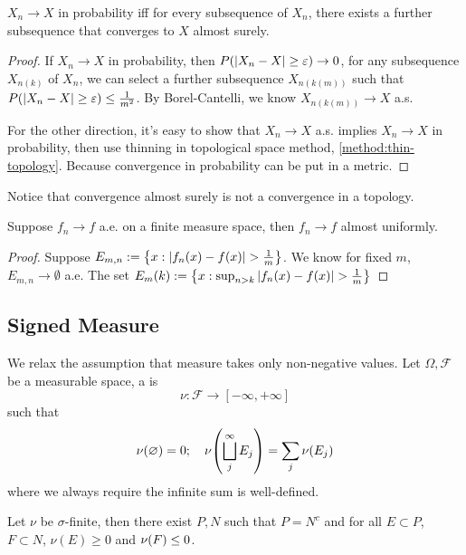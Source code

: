 \begin{thm}
    \(X_{n} \to X\) in probability iff for every subsequence of \(X_{n}\), there exists a further subsequence that converges to \(X\) almost surely. 
\end{thm}
\begin{proof}
    If \(X_{n}\to X\) in probability, then \(P\pqty{\abs{X_{n} - X} \geq \epsilon} \to 0\), for any subsequence \(X_{n(k)}\) of \(X_{n}\), we can select a further subsequence \(X_{n(k(m))}\) such that \(P \pqty{\abs{X_{n} - X} \geq \epsilon} \leq \frac{1}{m^{2}}\). By Borel-Cantelli, we know \(X_{n(k(m))} \to X\) a.s. 

    For the other direction, it's easy to show that \(X_{n} \to X\) a.s. implies \(X_{n}\to X\) in probability, then use thinning in topological space method, \autoref{method:thin-topology}. Because convergence in probability can be put in a metric.
\end{proof}
\begin{remark}
    Notice that convergence almost surely is not a convergence in a topology. 
\end{remark}

\begin{thm}
    Suppose \(f_{n} \to f\) a.e. on a finite measure space, then \(f_{n} \to f\) almost uniformly. 
\end{thm}
\begin{proof}
    Suppose \(E_{m,n} := \Bqty{x: \abs{f_{n}(x) - f(x)} > \frac{1}{m}}\). We know for fixed \(m\), \(E_{m,n} \to \emptyset\) a.e. The set \(E_{m}(k):= \Bqty{x: \sup_{n > k} \abs{f_{n}(x) - f(x)} > \frac{1}{m}} \)  
\end{proof}
\subsection{Signed Measure}


We relax the assumption that measure takes only non-negative values. Let \(\Omega, \mathcal{F}\) be a measurable space, a  is \begin{equation*}
    \nu: \mathcal{F} \to [-\infty,+ \infty]
\end{equation*}
such that 
\begin{equation*}
    \nu\pqty{\emptyset} = 0; \quad \nu\pqty{\bigsqcup_{j}^{\infty} E_{j}} = \sum_{j} \nu\pqty{E_{j}} 
\end{equation*}
where we always require the infinite sum is well-defined. 

\begin{thm}
    Let \(\nu\) be \(\sigma\)-finite, then there exist \(P,N\) such that \(P = N^{c}\) and for all \(E\subset P\), \(F\subset N\), \(\nu(E) \geq 0\) and \(\nu \pqty{F} \leq 0\). 
\end{thm}




